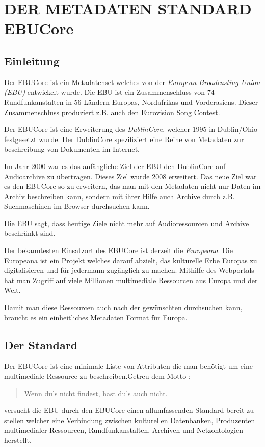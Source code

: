 	\section{DER METADATEN STANDARD EBUCore}
	
	\subsection{Einleitung}
	Der EBUCore ist ein Metadatenset welches von der \emph{European Broadcasting Union (EBU)} entwickelt wurde. Die EBU ist ein Zusammenschluss von 74 Rundfunkanstalten  in 56 Ländern Europas, Nordafrikas und Vorderasiens. Dieser Zusammenschluss produziert z.B. auch den Eurovision Song Contest.
	
	Der EBUCore ist eine Erweiterung des \emph{DublinCore}, welcher 1995 in Dublin/Ohio festgesetzt wurde. Der DublinCore spezifiziert eine Reihe von Metadaten zur beschreibung von Dokumenten im Internet.
	
	Im Jahr 2000 war es das anfängliche Ziel der EBU den DublinCore auf Audioarchive zu übertragen. Dieses Ziel wurde 2008 erweitert. Das neue Ziel war es den EBUCore so zu erweitern, das man mit den Metadaten nicht nur Daten im Archiv beschreiben kann, sondern mit ihrer Hilfe auch Archive durch z.B. Suchmaschinen im Browser durchsuchen kann.
	
	Die EBU sagt, dass heutige Ziele nicht mehr auf Audioressourcen und Archive beschränkt sind.
	
	Der bekanntesten Einsatzort des EBUCore ist derzeit die \emph{Europeana}. Die Europeana ist ein Projekt welches darauf abzielt, das kulturelle Erbe Europas zu digitalisieren und für jedermann zugänglich zu machen. Mithilfe des Webportals hat man Zugriff auf viele Millionen multimediale Ressourcen aus Europa und der Welt.
	
	Damit man diese Ressourcen auch nach der gewünschten durchsuchen kann, braucht es ein einheitliches Metadaten Format für Europa.
	
	\subsection{Der Standard}
	Der EBUCore ist eine minimale Liste von Attributen die man benötigt um eine multimediale Ressource zu beschreiben.Getreu dem Motto :\begin{quote}Wenn du's nicht findest, hast du's auch nicht.\end{quote} versucht die EBU durch den EBUCore einen allumfassenden Standard bereit zu stellen welcher eine Verbindung zwischen kulturellen Datenbanken, Produzenten multimedialer Ressourcen, Rundfunkanstalten, Archiven und Netzontologien herstellt.
	
